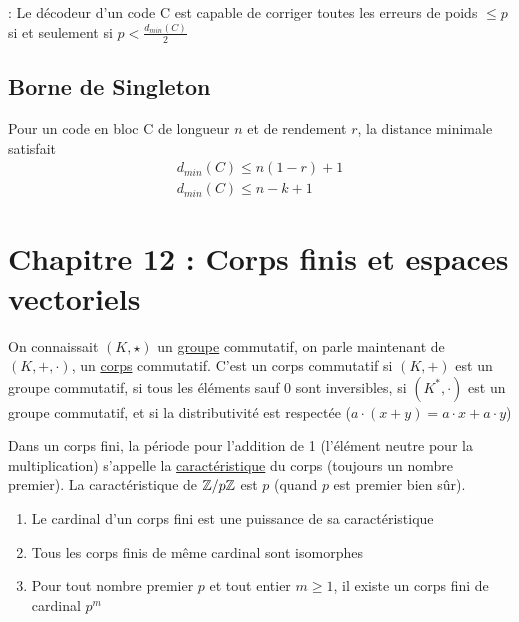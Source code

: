 \documentclass[11pt,a4paper]{article}
\renewcommand{\)}{\right)}
\renewcommand{\(}{\left(}
\begin{document}
 : Le décodeur d'un code C est capable de corriger toutes les erreurs de poids $\leq p$ si et seulement si $p < \frac{d_{min}(C)}{2}$ 

\subsection{Borne de Singleton}
\label{Singleton}
Pour un code en bloc C de longueur $n$ et de rendement $r$, la distance minimale satisfait 
\begin{align*}
		d_{min}(C) \leq n(1-r) + 1\\
		d_{min}(C) \leq n- k + 1
\end{align*}

\section[Corps fini, espace vectoriel]{Chapitre 12 : Corps finis et espaces vectoriels}

On connaissait $(K,\star)$ un \uline{groupe} commutatif, on parle maintenant de $(K,+,\cdot)$, un \uline{corps} commutatif. C'est un corps commutatif si $(K,+)$ est un groupe commutatif, si tous les éléments sauf 0 sont inversibles, si $(K^*,\cdot)$ est un groupe commutatif, et si la distributivité est respectée \big($a\cdot(x+y) = a\cdot x + a\cdot y$\big)

Dans un corps fini, la période pour l'addition de 1 (l'élément neutre pour la multiplication) s'appelle la \uline{caractéristique} du corps (toujours un nombre premier). La caractéristique de $\mathbb{Z}/p\mathbb{Z}$ est $p$ (quand $p$ est premier bien sûr).\\
\begin{enumerate}
	\item 	Le cardinal d'un corps fini est une puissance de sa caractéristique
	\item 	Tous les corps finis de même cardinal sont isomorphes
	\item 	Pour tout nombre premier $p$ et tout entier $m \geq 1$, il existe un corps fini de cardinal $p^m$
\end{enumerate}
\end{document}
